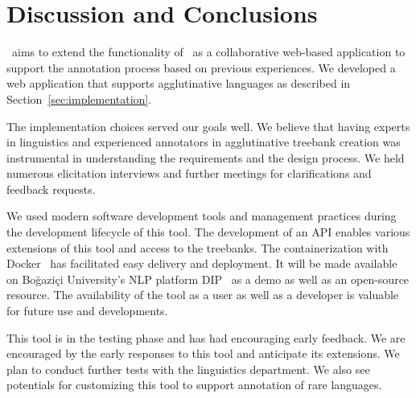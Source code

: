 \section{Discussion and Conclusions}
\label{sec:discussion}

\boatvtwo\ aims to  extend the functionality of \boatvone\ as a collaborative web-based application to support the annotation process based on previous experiences.
We developed a web application that supports agglutinative languages as described in Section~\ref{sec:implementation}.

The implementation choices served our goals well.
We believe that having experts in linguistics and experienced annotators in agglutinative treebank creation was instrumental in understanding the requirements and the design process.
We held numerous elicitation interviews and further meetings for clarifications and feedback requests.

We used modern software development tools and management practices during the development lifecycle of this tool.
The development of an API enables various extensions of this tool and access to the treebanks.
The containerization with Docker~\cite{docker} has facilitated easy delivery and deployment.
It will be made available on Boğaziçi University's NLP platform DIP~\cite{DIP} as a demo as well as an open-source resource.
The availability of the tool as a user as well as a developer is valuable for future use and developments.

This tool is in the testing phase and has had encouraging early feedback.
We are encouraged by the early responses to this tool and anticipate its extensions.
We plan to conduct further tests with the linguistics department.
We also see potentials for customizing this tool to support annotation of rare languages.
